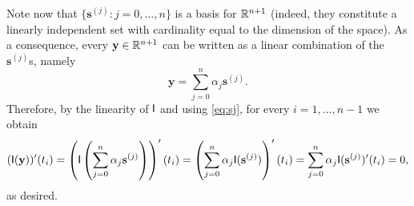 \begin{problem}
\begin{subproblem}[4]
\begin{solution}
Note now that $\{\mathbf{s}^{(j)}:j=0,\dots,n\}$ is a basis for $\mathbb{R}^{n+1}$ (indeed, they constitute a linearly independent set with cardinality equal to the dimension of the space). As a consequence, every $\mathbf{y}\in\mathbb{R}^{n+1}$ can be written as a linear combination of the $\mathbf{s}^{(j)}$s, namely
\[
\mathbf{y}=\sum_{j=0}^n \alpha_j \mathbf{s}^{(j)}.
\]
Therefore, by the linearity of $\mathsf{I}$ and using \eqref{eq:sj}, for every $i=1,\dots,n-1$ we obtain
\[
(\mathsf{I}(\mathbf{y}))'(t_i)=\left(\mathsf{I}\left(\sum_{j=0}^n \alpha_j \mathbf{s}^{(j)}\right)\right)'(t_i) 
=\left(\sum_{j=0}^n \alpha_j \mathsf{I}(\mathbf{s}^{(j)})\right)'(t_i) 
=\sum_{j=0}^n \alpha_j \mathsf{I}(\mathbf{s}^{(j)})'(t_i) 
=0,
\]
as desired.
\end{solution}
\end{subproblem}
\end{problem}
